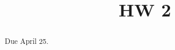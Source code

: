 \documentclass{ximera}
\title{HW 2}
\begin{document}
    \begin{abstract}  Due April 25.  \end{abstract}
    \maketitle
\end{document}
